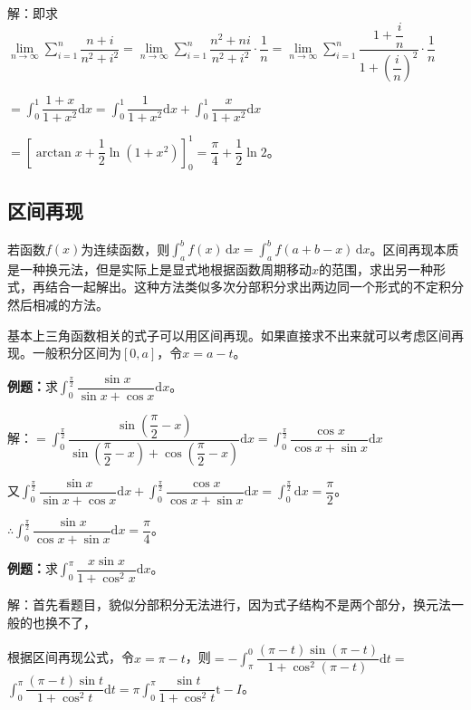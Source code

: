 \documentclass[UTF8, 12pt]{ctexart}
\begin{document}
解：即求$\lim\limits_{n\to\infty}\sum\limits_{i=1}^n\dfrac{n+i}{n^2+i^2}=\lim\limits_{n\to\infty}\sum\limits_{i=1}^n\dfrac{n^2+ni}{n^2+i^2}\cdot\dfrac{1}{n}=\lim\limits_{n\to\infty}\sum\limits_{i=1}^n\dfrac{1+\dfrac{i}{n}}{1+\left(\dfrac{i}{n}\right)^2}\cdot\dfrac{1}{n}$

$=\displaystyle{\int_0^1\dfrac{1+x}{1+x^2}\textrm{d}x}=\displaystyle{\int_0^1\dfrac{1}{1+x^2}\textrm{d}x+\int_0^1\dfrac{x}{1+x^2}\textrm{d}x}$

$=\left[\arctan x+\dfrac{1}{2}\ln(1+x^2)\right]_0^1=\dfrac{\pi}{4}+\dfrac{1}{2}\ln2$。

\subsection{区间再现}

若函数$f(x)$为连续函数，则$\int_a^bf(x)\,\textrm{d}x=\int_a^bf(a+b-x)\,\textrm{d}x$。区间再现本质是一种换元法，但是实际上是显式地根据函数周期移动$x$的范围，求出另一种形式，再结合一起解出。这种方法类似多次分部积分求出两边同一个形式的不定积分然后相减的方法。

基本上三角函数相关的式子可以用区间再现。如果直接求不出来就可以考虑区间再现。一般积分区间为$[0,a]$，令$x=a-t$。

\textbf{例题：}求$\displaystyle{\int_0^\frac{\pi}{2}\dfrac{\sin x}{\sin x+\cos x}\textrm{d}x}$。

解：$=\displaystyle{\int_0^\frac{\pi}{2}\dfrac{\sin(\dfrac{\pi}{2}-x)}{\sin(\dfrac{\pi}{2}-x)+\cos(\dfrac{\pi}{2}-x)}\textrm{d}x=\int_0^\frac{\pi}{2}\dfrac{\cos x}{\cos x+\sin x}\textrm{d}x}$

又$\displaystyle{\int_0^\frac{\pi}{2}\dfrac{\sin x}{\sin x+\cos x}\textrm{d}x+\int_0^\frac{\pi}{2}\dfrac{\cos x}{\cos x+\sin x}\textrm{d}x}$$=\int_0^\frac{\pi}{2}\textrm{d}x=\dfrac{\pi}{2}$。

$\therefore\displaystyle{\int_0^\frac{\pi}{2}\dfrac{\sin x}{\cos x+\sin x}\textrm{d}x}=\dfrac{\pi}{4}$。

\textbf{例题：}求$\displaystyle{\int_0^\pi}\dfrac{x\sin x}{1+\cos^2x}\textrm{d}x$。

解：首先看题目，貌似分部积分无法进行，因为式子结构不是两个部分，换元法一般的也换不了，

根据区间再现公式，令$x=\pi-t$，则$=-\displaystyle{\int_\pi^0\dfrac{(\pi-t)\sin(\pi-t)}{1+\cos^2(\pi-t)}\textrm{d}t}=$\\$\displaystyle{\int_0^\pi\dfrac{(\pi-t)\sin t}{1+\cos^2t}\textrm{d}t}=\pi\displaystyle{\int_0^\pi\dfrac{\sin t}{1+\cos^2t}\textrm{t}-I}$。
\end{document}
